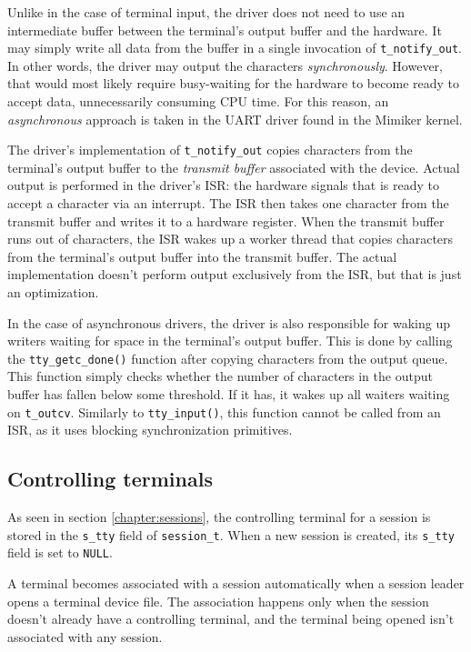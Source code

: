 \documentclass[shortabstract, manyadvisors, english, mgr]{iithesis}
\begin{document}
Unlike in the case of terminal input, the driver does not need to use an
intermediate buffer between the terminal's output buffer and the hardware. It
may simply write all data from the buffer in a single invocation of
\texttt{t\_notify\_out}. In other words, the driver may output the characters
\textit{synchronously}. However, that would most likely require busy-waiting for
the hardware to become ready to accept data, unnecessarily consuming CPU time.
For this reason, an \textit{asynchronous} approach is taken in the UART driver
found in the Mimiker kernel.

The driver's implementation of \texttt{t\_notify\_out} copies characters from
the terminal's output buffer to the \textit{transmit buffer} associated with the
device. Actual output is performed in the driver's ISR: the hardware signals
that is ready to accept a character via an interrupt. The ISR then takes one
character from the transmit buffer and writes it to a hardware register. When
the transmit buffer runs out of characters, the ISR wakes up a worker thread
that copies characters from the terminal's output buffer into the transmit
buffer. The actual implementation doesn't perform output exclusively from the
ISR, but that is just an optimization.

In the case of asynchronous drivers, the driver is also responsible for waking
up writers waiting for space in the terminal's output buffer. This is done by
calling the \texttt{tty\_getc\_done()} function after copying characters from
the output queue. This function simply checks whether the number of characters
in the output buffer has fallen below some threshold. If it has, it wakes up all
waiters waiting on \texttt{t\_outcv}. Similarly to \texttt{tty\_input()}, this
function cannot be called from an ISR, as it uses blocking synchronization
primitives.

\subsection{Controlling terminals}

As seen in section \ref{chapter:sessions}, the controlling terminal for a
session is stored in the \texttt{s\_tty} field of \texttt{session\_t}. When a
new session is created, its \texttt{s\_tty} field is set to \texttt{NULL}.

A terminal becomes associated with a session automatically when a session leader
opens a terminal device file. The association happens only when the session
doesn't already have a controlling terminal, and the terminal being opened isn't
associated with any session.
\end{document}
